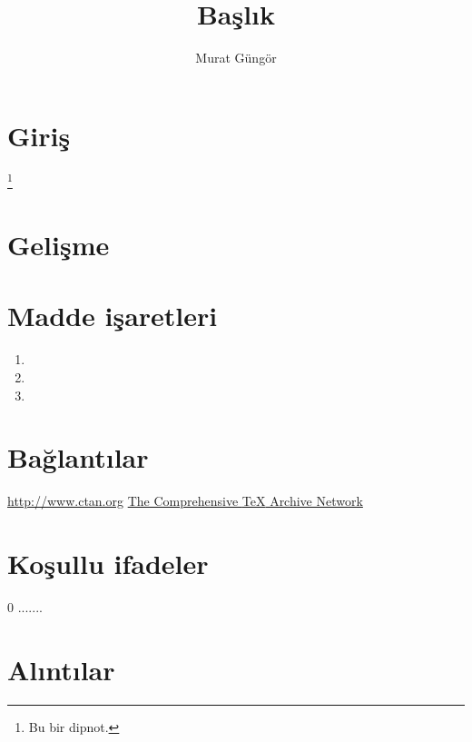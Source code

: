 \documentclass{article}
\title{Başlık}
\author{Murat Güngör}
\newcommand{\var}{0} %
\begin{document}

\maketitle

\begin{abstract}
\lipsum[1][1-6]
\end{abstract}

\section{Giriş}
\label{sec:intro}
\lipsum[2][1-6]\footnote
{
Bu bir dipnot.
}

\lipsum[3][1-6]

\section{Gelişme}

\lipsum[4][1-6]

\lipsum[5][1-6]

\newpage


\section*{Madde işaretleri}

\lipsum[6][1-6]
\begin{enumerate}
\item \lipsum[7][1]
\item \lipsum[7][2]
\item \lipsum[7][3]
\end{enumerate}
\lipsum[8][1-6]

\section*{Bağlantılar}

\url{http://www.ctan.org}
\href{http://www.ctan.org}{The Comprehensive {\TeX} Archive Network}

\section*{Koşullu ifadeler}

\if \var 0 {.......} \fi

\section*{Alıntılar}

\lipsum[9][1-3]
%
\begin{displayquote}
\lipsum[9][4-9]
\end{displayquote}
%
\lipsum[9][10-15]
	
\end{document}
